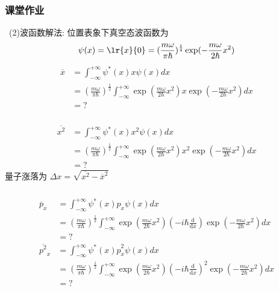     \begin{frame}
        \frametitle{课堂作业}
        \解~(2)波函数解法: 位置表象下真空态波函数为\[ \psi(x)=\lr{x}{0} = (\frac{m \omega }{\pi  \hbar})^{\frac{1}{4}}  \exp(- \frac{m \omega }{2 \hbar} x^2)\] 
        \[\begin{aligned}
            \overline{x} & = \int_{-\infty}^{+\infty} \psi^{*}(x) x \psi(x) d x  \\ 
            &= (\frac{m \omega }{\pi  \hbar})^{\frac{1}{2}}  \int_{-\infty}^{+\infty} \exp(\frac{m \omega }{2 \hbar} x^2) x \exp(- \frac{m \omega }{2 \hbar} x^2) d x  \\ 
            &= ? 
        \end{aligned} \]
    \end{frame}  

\begin{frame}
    \frametitle{}
    \[\begin{aligned}
        \overline{x^2} & = \int_{-\infty}^{+\infty} \psi^{*}(x) x^2 \psi(x) d x  \\ 
        &= (\frac{m \omega }{\pi  \hbar})^{\frac{1}{2}}  \int_{-\infty}^{+\infty} \exp(\frac{m \omega }{2 \hbar} x^2) x^2 \exp(- \frac{m \omega }{2 \hbar} x^2) d x  \\ 
        &= ? 
    \end{aligned} \]
    量子涨落为 $\Delta x  = \sqrt{ \overline{x^2}- \overline{x}^2}$ \\ 
\end{frame}

\begin{frame}
    \frametitle{}
    \[\begin{aligned}
        \overline{p}_x & = \int_{-\infty}^{+\infty} \psi^{*}(x) \hat{p}_x \psi(x) d x  \\ 
        &= (\frac{m \omega }{\pi  \hbar})^{\frac{1}{2}}  \int_{-\infty}^{+\infty} \exp(\frac{m \omega }{2 \hbar} x^2) (-i\hbar \frac{\mathrm{d}}{\mathrm{d}x}) \exp(- \frac{m \omega }{2 \hbar} x^2) d x  \\ 
        &= ?  \\
        \overline{p^2}_x & = \int_{-\infty}^{+\infty} \psi^{*}(x) \hat{p}_x ^2 \psi(x) d x  \\ 
        &= (\frac{m \omega }{\pi  \hbar})^{\frac{1}{2}}  \int_{-\infty}^{+\infty} \exp(\frac{m \omega }{2 \hbar} x^2) (-i\hbar \frac{\mathrm{d}}{\mathrm{d}x})^2 \exp(- \frac{m \omega }{2 \hbar} x^2) d x  \\ 
        &= ? 
    \end{aligned} \]
\end{frame}

